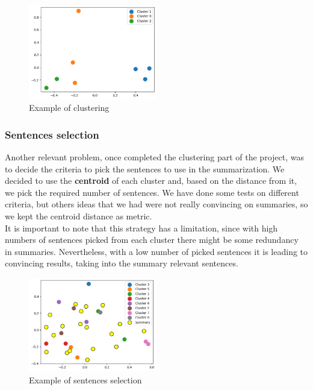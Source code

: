 \begin{figure}[H]
  \centering
  \includegraphics[width=0.5\textwidth]{images/clustering1.png}
  \caption{Example of clustering}
  \label{fig:cs1}

\end{figure}

\subsubsection*{Sentences selection}
Another relevant problem, once completed the clustering part of the project, was to decide the criteria to pick the sentences to use in the summarization. We decided to use the \textbf{centroid} of each cluster and, based on the distance from it, we pick the required number of sentences. We have done some tests on different criteria, but others ideas that we had were not really convincing on summaries, so we kept the centroid distance as metric.\\ It is important to note that this strategy has a limitation, since with high numbers of sentences picked from each cluster there might be some redundancy in summaries. Nevertheless, with a low number of picked sentences it is leading to convincing results, taking into the summary relevant sentences.

\begin{figure}[H]
    \centering
    \includegraphics[width=0.5\textwidth]{images/sentences_2d.png}
    \caption{Example of sentences selection}
    \label{fig:ss1}
\end{figure}


